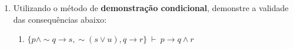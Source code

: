 \documentclass[12pt, a4paper,final]{article}
\begin{document}
\begin{enumerate}
\begin{enumerate}









 
  
\end{enumerate}


 \item Utilizando o m\'etodo de {\bf demonstra\c c\~ao condicional}, demonstre a validade das consequ\^encias abaixo: 
 
\begin{enumerate}

\item $\{ p \wedge \sim q \rightarrow s, \sim (s \vee u), q \rightarrow r \} ~\vdash~ p \rightarrow q \wedge r$



\end{enumerate}
\end{enumerate}
\end{document}
